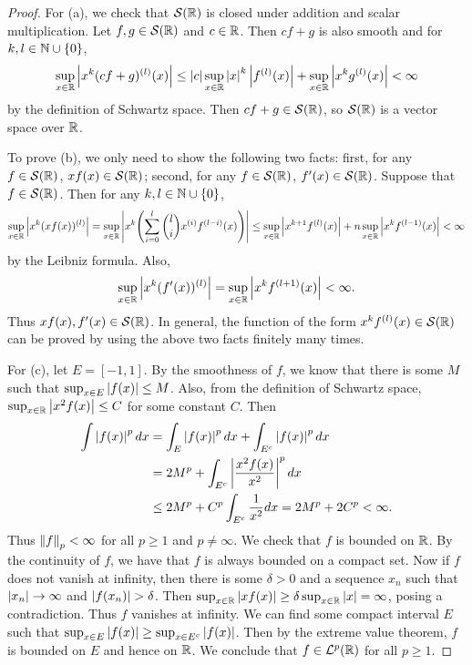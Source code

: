 \begin{proof}
    For (a), we check that $\mathcal{S}(\mathbb{R})$ is closed under addition and scalar multiplication. 
    Let $f,g\in\mathcal{S}(\mathbb{R})$ and $c\in\mathbb{R}$. Then $cf+g$ is also smooth and for $k,l\in\mathbb{N}\cup\left\{ {0} \right\}$, 
    \begin{equation*}
        \sup_{x\in\mathbb{R}}\left\lvert {x^k(cf+g)^{(l)}(x)} \right\rvert\leq \left\lvert {c} \right\rvert\sup_{x\in\mathbb{R}} \left\lvert {x} \right\rvert^k\left\lvert {f^{(l)}(x)} \right\rvert + \sup_{x\in\mathbb{R}}\left\lvert {x^k g^{(l)}(x)} \right\rvert<\infty
    \end{equation*}
    by the definition of Schwartz space. Then $cf+g\in\mathcal{S}(\mathbb{R})$, so $\mathcal{S}(\mathbb{R})$ is a vector space over $\mathbb{R}$. 

    To prove (b), we only need to show the following two facts: 
    first, for any $f\in\mathcal{S}(\mathbb{R})$, $xf(x)\in \mathcal{S}(\mathbb{R})$; second, for any $f\in\mathcal{S}(\mathbb{R})$, 
    $f'(x)\in\mathcal{S}(\mathbb{R})$. Suppose that $f\in\mathcal{S}(\mathbb{R})$. Then for any $k,l\in\mathbb{N}\cup\left\{ {0} \right\}$, 
    \begin{equation*}
        \sup_{x\in\R}\abs{x^k(xf(x))^{(l)}} = \sup_{x\in\R}\abs{x^k\pth{\sum_{i=0}^{l}\binom{l}{i}x^{(i)}f^{(l-i)}(x)}} 
        \leq \sup_{x\in\R} \abs{x^{k+1}f^{(l)}(x)} + n\sup_{x\in\R}\abs{x^kf^{(l-1)}(x)} < \infty
    \end{equation*}
    by the Leibniz formula. Also, 
    \begin{equation*}
        \sup_{x\in\mathbb{R}}\left\lvert {x^k(f'(x))^{(l)}} \right\rvert = \sup_{x\in\mathbb{R}}\left\lvert {x^kf^{(l+1)}(x)} \right\rvert < \infty.
    \end{equation*}
    Thus $xf(x), f'(x)\in\mathcal{S}(\mathbb{R})$. In general, the function of the form 
    $x^kf^{(l)}(x)\in\mathcal{S}(\mathbb{R})$ can be proved by using the above two facts 
    finitely many times. 

    For (c), let $E = [-1,1]$. By the smoothness of $f$, we know that 
    there is some $M$ such that $\sup_{x\in E}\left\lvert {f(x)} \right\rvert\leq M$. Also, 
    from the definition of Schwartz space, $\sup_{x\in\mathbb{R}}\left\lvert {x^2f(x)} \right\rvert\leq C$ 
    for some constant $C$. Then 
    \begin{equation*}
        \begin{split}
            \int \left\lvert {f(x)} \right\rvert^p dx &= \int_E \left\lvert {f(x)} \right\rvert^p dx + \int_{E^c} \left\lvert {f(x)} \right\rvert^p dx \\ 
            &= 2M^p + \int_{E^c} \left\lvert {\frac{x^2f(x)}{x^2}} \right\rvert^p dx \\ 
            &\leq 2M^p + C^p\int_{E^c} \frac{1}{x^2} dx 
            = 2M^p + 2C^p < \infty.
        \end{split}
    \end{equation*}
    Thus $\left\lVert {f} \right\rVert_p<\infty$ for all $p\geq 1$ and $p\neq \infty$. 
    We check that $f$ is bounded on $\mathbb{R}$. By the continuity of $f$, 
    we have that $f$ is always bounded on a compact set. Now if 
    $f$ does not vanish at infinity, then there is some $\delta>0$ 
    and a sequence $x_n$ such that $\left\lvert {x_n} \right\rvert\to\infty$ and 
    $\left\lvert {f(x_n)} \right\rvert>\delta$. Then $\sup_{x\in\mathbb{R}}\left\lvert {xf(x)} \right\rvert 
    \geq \delta\sup_{x\in\mathbb{R}}\left\lvert {x} \right\rvert = \infty$, posing a contradiction. 
    Thus $f$ vanishes at infinity. We can find some compact interval 
    $E$ such that $\sup_{x\in E}\left\lvert {f(x)} \right\rvert\geq \sup_{x\in E^c}\left\lvert {f(x)} \right\rvert$. 
    Then by the extreme value theorem, $f$ is bounded on $E$ and hence 
    on $\mathbb{R}$. We conclude that $f\in\mathcal{L}^p(\mathbb{R})$ for all $p\geq 1$.
\end{proof}

